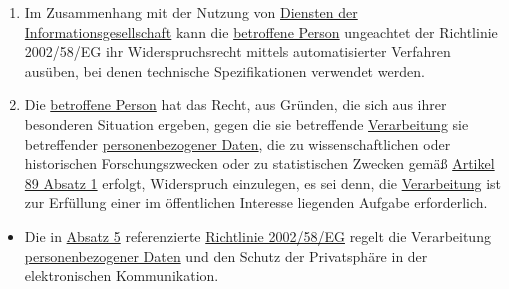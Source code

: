 \begin{enumerate}
  \item Im Zusammenhang mit der Nutzung von \hyperref[itm:04-28]{Diensten der Informationsgesellschaft} kann
   die \hyperref[itm:04-1]{betroffene Person} ungeachtet der Richtlinie 2002/58/EG ihr Widerspruchsrecht mittels
   automatisierter Verfahren ausüben, bei denen technische Spezifikationen verwendet werden.%
  \label{itm:21-5}

  \item Die \hyperref[itm:04-1]{betroffene Person} hat das Recht, aus Gründen, die sich aus ihrer besonderen Situation
   ergeben, gegen die sie betreffende \hyperref[itm:04-2]{Verarbeitung} sie betreffender \hyperref[itm:04-1]
   {personenbezogener Daten}, die zu wissenschaftlichen oder historischen Forschungszwecken oder zu statistischen
   Zwecken gemäß \hyperref[itm:89-1]{Artikel 89 Absatz 1} erfolgt, Widerspruch einzulegen, es sei denn, die \hyperref
   [itm:04-2]{Verarbeitung} ist zur Erfüllung einer im öffentlichen Interesse liegenden Aufgabe erforderlich.%
  \label{itm:21-6}

\end{enumerate}


\begin{itemize}

  \item Die in \hyperref[itm:21-5]{Absatz 5} referenzierte
   \href{https://eur-lex.europa.eu/legal-content/DE/TXT/HTML/?uri=CELEX:32002L0058&qid=1659212895940&from=DE}
    {Richtlinie 2002/58/EG} regelt die Verarbeitung \hyperref[itm:04-1]{personenbezogener Daten} und den Schutz der
    Privatsphäre in der elektronischen Kommunikation.

\end{itemize}




